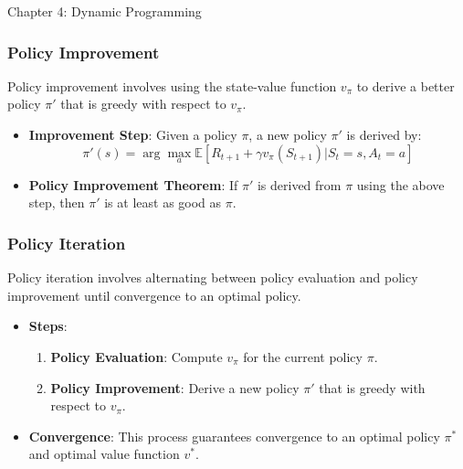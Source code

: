 \begin{notes}{Chapter 4: Dynamic Programming}
    \subsubsection*{Policy Improvement}
    
    Policy improvement involves using the state-value function \(v_\pi\) to derive a better policy \(\pi'\) that is greedy with respect to \(v_\pi\).
    
    \begin{highlight}
    
        \begin{itemize}
            \item \textbf{Improvement Step}: Given a policy \(\pi\), a new policy \(\pi'\) is derived by:
            \[
            \pi'(s) = \arg\max_a \mathbb{E}[R_{t+1} + \gamma v_\pi(S_{t+1}) | S_t = s, A_t = a]
            \]
            \item \textbf{Policy Improvement Theorem}: If \(\pi'\) is derived from \(\pi\) using the above step, then \(\pi'\) is at least as good as \(\pi\).
        \end{itemize}
    
    \end{highlight}
    
    \subsubsection*{Policy Iteration}
    
    Policy iteration involves alternating between policy evaluation and policy improvement until convergence to an optimal policy.
    
    \begin{highlight}
    
        \begin{itemize}
            \item \textbf{Steps}:
                \begin{enumerate}
                    \item \textbf{Policy Evaluation}: Compute \(v_\pi\) for the current policy \(\pi\).
                    \item \textbf{Policy Improvement}: Derive a new policy \(\pi'\) that is greedy with respect to \(v_\pi\).
                \end{enumerate}
            \item \textbf{Convergence}: This process guarantees convergence to an optimal policy \(\pi^*\) and optimal value function \(v^*\).
        \end{itemize}
    

\end{highlight}
\end{notes}
